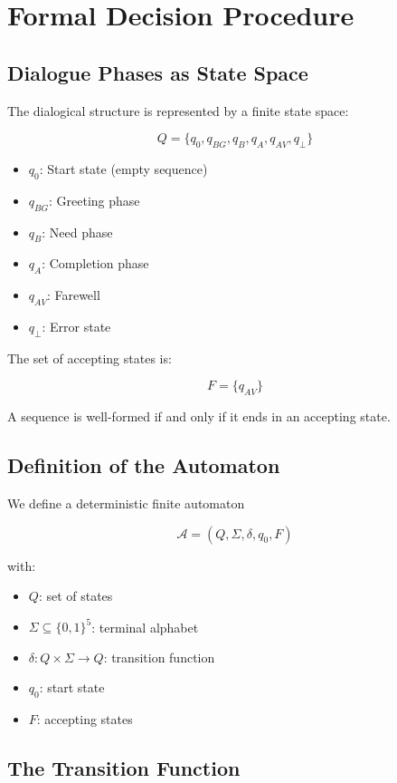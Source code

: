 \documentclass[
  12pt,
  a4paper,
  oneside,
  titlepage
]{article}
\begin{document}
\section{Formal Decision Procedure}

\subsection{Dialogue Phases as State Space}

The dialogical structure is represented by a finite state space:

\[
Q = \{q_0, q_{BG}, q_B, q_A, q_{AV}, q_\bot\}
\]

\begin{itemize}
    \item \(q_0\): Start state (empty sequence)
    \item \(q_{BG}\): Greeting phase
    \item \(q_B\): Need phase
    \item \(q_A\): Completion phase
    \item \(q_{AV}\): Farewell
    \item \(q_\bot\): Error state
\end{itemize}

The set of accepting states is:

\[
F = \{q_{AV}\}
\]

A sequence is well-formed if and only if it ends in an accepting state.

\subsection{Definition of the Automaton}

We define a deterministic finite automaton

\[
\mathcal{A} = (Q, \Sigma, \delta, q_0, F)
\]

with:
\begin{itemize}
    \item \(Q\): set of states
    \item \(\Sigma \subseteq \{0,1\}^5\): terminal alphabet
    \item \(\delta: Q \times \Sigma \to Q\): transition function
    \item \(q_0\): start state
    \item \(F\): accepting states
\end{itemize}

\subsection{The Transition Function}
\end{document}
